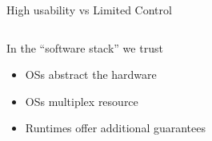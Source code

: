 \documentclass[10pt,xcolor={dvipsnames}]{beamer}
\begin{document}
\begin{frame}{High usability vs Limited Control}
\begin{columns}
				\begin{scriptsize}
					\begin{alertblock}{In the ``software stack'' we trust}
						\begin{itemize}
							\item OSs abstract the hardware
							\item OSs multiplex resource
							\item Runtimes offer additional guarantees
						\end{itemize}
					\end{alertblock}
				\end{scriptsize}
			\end{columns}
		\vspace{0.2cm}
	\end{frame}
	
	
\end{document}
